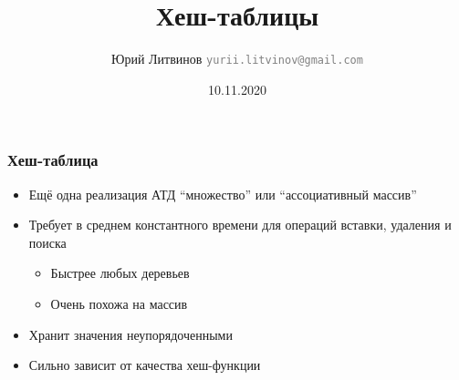 \documentclass[xetex,mathserif,serif]{beamer}
\title{Хеш-таблицы}
\author[Юрий Литвинов]{Юрий Литвинов \newline \textcolor{gray}{\small\texttt{yurii.litvinov@gmail.com}}}
\date{10.11.2020}
\begin{document}
    
    \frame{\titlepage}

    \begin{frame}
        \frametitle{Хеш-таблица}
        \begin{itemize}
            \item Ещё одна реализация АТД ``множество'' или ``ассоциативный массив''
            \item Требует в среднем константного времени для операций вставки, удаления и поиска
            \begin{itemize}
                \item Быстрее любых деревьев
                \item Очень похожа на массив
            \end{itemize}
            \item Хранит значения неупорядоченными
            \item Сильно зависит от качества хеш-функции
        \end{itemize}
    \end{frame}
\end{document}
